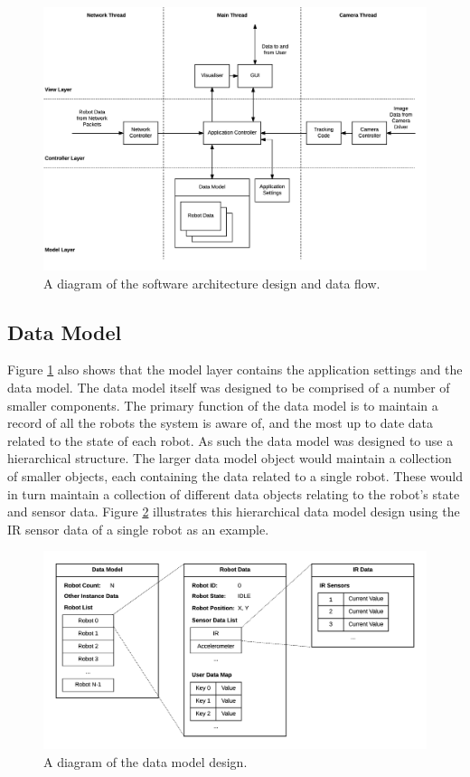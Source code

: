 \begin{figure}
	\centering
	\includegraphics[scale=0.7]{Figures/SoftwareArchitecture.png}
	\decoRule
	\caption[Software Architecture Diagram]{A diagram of the software architecture design and data flow.}
	\label{fig:SoftwareArchitecture}
\end{figure}

\subsection{Data Model} \label{DataModelDesign}
Figure \ref{fig:SoftwareArchitecture} also shows that the model layer contains the application settings and the data model. The data model itself was designed to be comprised of a number of smaller components. The primary function of the data model is to maintain a record of all the robots the system is aware of, and the most up to date data related to the state of each robot. As such the data model was designed to use a hierarchical structure. The larger data model object would maintain a collection of smaller objects, each containing the data related to a single robot. These would in turn maintain a collection of different data objects relating to the robot's state and sensor data. Figure \ref{fig:DataModel} illustrates this hierarchical data model design using the IR sensor data of a single robot as an example.

\begin{figure}
	\centering
	\includegraphics[scale=0.7]{Figures/DataModel.png}
	\decoRule
	\caption[Data Model Diagram]{A diagram of the data model design.}
	\label{fig:DataModel}
\end{figure}

